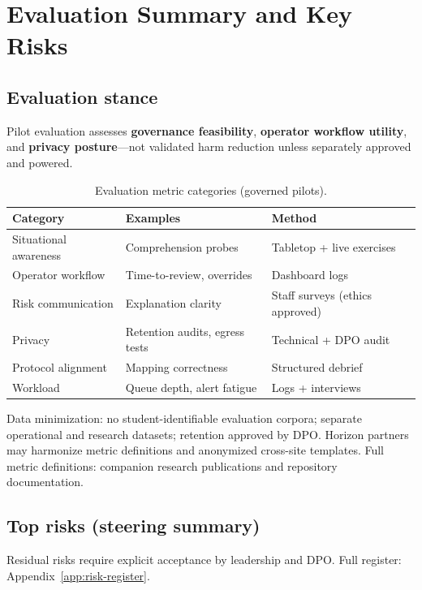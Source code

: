 \section{Evaluation Summary and Key Risks}
\label{sec:evaluation-summary}
\label{sec:evaluation-metrics}

\subsection{Evaluation stance}

Pilot evaluation assesses \textbf{governance feasibility}, \textbf{operator workflow utility}, and
\textbf{privacy posture}---not validated harm reduction unless separately approved and powered.

\begin{table}[htbp]
  \centering
  \caption{Evaluation metric categories (governed pilots).}
  \label{tab:eval-metrics}
  \small
  \begin{tabular}{@{}p{2.4cm}p{3.8cm}p{4.8cm}@{}}
    \toprule
    Category & Examples & Method \\
    \midrule
    Situational awareness & Comprehension probes & Tabletop + live exercises \\
    Operator workflow & Time-to-review, overrides & Dashboard logs \\
    Risk communication & Explanation clarity & Staff surveys (ethics approved) \\
    Privacy & Retention audits, egress tests & Technical + DPO audit \\
    Protocol alignment & Mapping correctness & Structured debrief \\
    Workload & Queue depth, alert fatigue & Logs + interviews \\
    \bottomrule
  \end{tabular}
\end{table}

Data minimization: no student-identifiable evaluation corpora; separate operational and research
datasets; retention approved by DPO.
Horizon partners may harmonize metric definitions and anonymized cross-site templates.
Full metric definitions: companion research publications and repository documentation.

\subsection{Top risks (steering summary)}

Residual risks require explicit acceptance by leadership and DPO.
Full register: Appendix~\ref{app:risk-register}.

